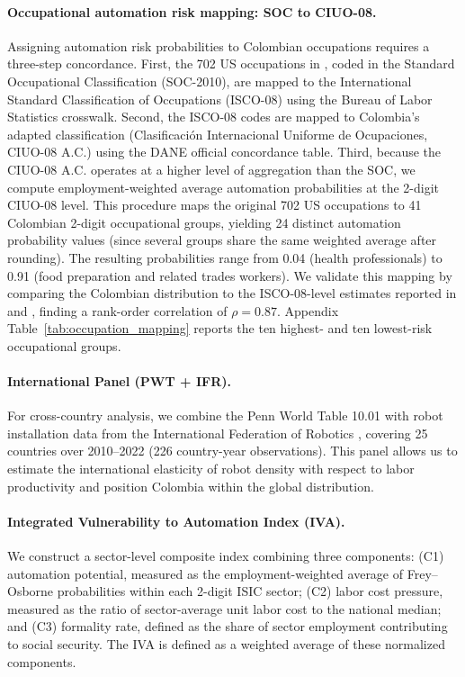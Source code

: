 \documentclass[5p,times,authoryear]{elsarticle}
\begin{document}
\paragraph{Occupational automation risk mapping: SOC to CIUO-08.} Assigning automation risk probabilities to Colombian occupations requires a three-step concordance. First, the 702 US occupations in \citet{frey2017future}, coded in the Standard Occupational Classification (SOC-2010), are mapped to the International Standard Classification of Occupations (ISCO-08) using the Bureau of Labor Statistics crosswalk. Second, the ISCO-08 codes are mapped to Colombia's adapted classification (Clasificaci\'{o}n Internacional Uniforme de Ocupaciones, CIUO-08 A.C.) using the DANE official concordance table. Third, because the CIUO-08 A.C. operates at a higher level of aggregation than the SOC, we compute employment-weighted average automation probabilities at the 2-digit CIUO-08 level. This procedure maps the original 702 US occupations to 41 Colombian 2-digit occupational groups, yielding 24 distinct automation probability values (since several groups share the same weighted average after rounding). The resulting probabilities range from 0.04 (health professionals) to 0.91 (food preparation and related trades workers). We validate this mapping by comparing the Colombian distribution to the ISCO-08-level estimates reported in \citet{arntz2016} and \citet{gmyrek2023generative}, finding a rank-order correlation of $\rho = 0.87$. Appendix Table~\ref{tab:occupation_mapping} reports the ten highest- and ten lowest-risk occupational groups.

\paragraph{International Panel (PWT + IFR).} For cross-country analysis, we combine the Penn World Table 10.01 with robot installation data from the International Federation of Robotics \citep{ifr2024}, covering 25 countries over 2010--2022 (226 country-year observations). This panel allows us to estimate the international elasticity of robot density with respect to labor productivity and position Colombia within the global distribution.

\paragraph{Integrated Vulnerability to Automation Index (IVA).} We construct a sector-level composite index combining three components: (C1) automation potential, measured as the employment-weighted average of Frey--Osborne probabilities within each 2-digit ISIC sector; (C2) labor cost pressure, measured as the ratio of sector-average unit labor cost to the national median; and (C3) formality rate, defined as the share of sector employment contributing to social security. The IVA is defined as a weighted average of these normalized components.
\end{document}
